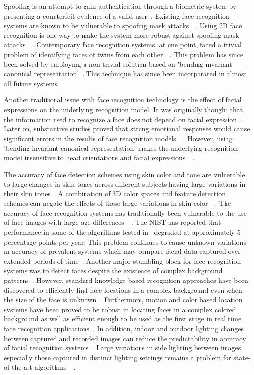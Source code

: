 \documentclass[10pt,twocolumn,pdftex]{article}
\begin{document}
Spoofing is an attempt to gain authentication through a biometric system by presenting a counterfeit evidence of a valid user~\cite{nix08}. Existing face recognition systems are known to be vulnerable to spoofing mask attacks~\cite{qin05}~\cite{erdo13}. Using 2D face recognition is one way to make the system more robust against spoofing mask attacks~\cite{mmc11}~\cite{nkjd13}. Contemporary face recognition systems, at one point, faced a trivial problem of identifying faces of twins from each other~\cite{daug03}~\cite{dv03}. This problem has since been solved by employing a non trivial solution based on 'bending invariant canonical representation'~\cite{amr05}. This technique has since been incorporated in almost all future systems.

Another traditional issue with face recognition technology is the effect of facial expressions on the underlying recognition model. It was originally thought that the information used to recognize a face does not depend on facial expression~\cite{bryo86}. Later on, substantive studies proved that strong emotional responses would cause significant errors in the results of face recognition models~\cite{endo1992}~\cite{givens03}. However, using 'bending invariant canonical representation' makes the underlying recognition model insensitive to head orientations and facial expressions~\cite{dv03}~\cite{amr05}. 

The accuracy of face detection schemes using skin color and tone are vulnerable to large changes in skin tones across different subjects having large variations in their skin tones~\cite{vlad03}. A combination of 3D color spaces and feature detection schemes can negate the effects of these large variations in skin color~\cite{garcia99}~\cite{kovac03}. The accuracy of face recognition systems has traditionally been vulnerable to the use of face images with large age differences~\cite{hsd07}~\cite{rs07}. The NIST has reported that performance in some of the algorithms tested in~\cite{frvt14} degraded at approximately 5 percentage points per year. This problem continues to cause unknown variations in accuracy of prevalent systems which may compare facial data captured over extended periods of time~\cite{frvt14}. Another major stumbling block for face recognition systems was to detect faces despite the existence of complex background patterns~\cite{birg11}. However, standard knowledge-based recognition approaches have been discovered to efficiently find face locations in a complex background even when the size of the face is unknown~\cite{guang94}. Furthermore, motion and color based location systems have been proved to be robust in locating faces in a complex colored background as well as efficient enough to be used as the first stage in real time face recognition applications~\cite{choong96}. In addition, indoor and outdoor lighting changes between captured and recorded images can reduce the predictability in accuracy of facial recognition systems~\cite{jhdk05}. Large variations in side lighting between images, especially those captured in distinct lighting settings remains a problem for state-of-the-art algorithms~\cite{xjmn94}~\cite{jrb10}. 
\end{document}
